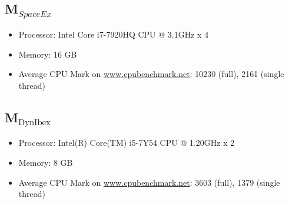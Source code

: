 \documentclass[EPiC]{easychair}
\begin{document}
\subsection{\texorpdfstring{M$_\mathit{SpaceEx}$}{M-SpaceEx}} \label{sec:machine:spaceex}
\begin{itemize}
	\item Processor: Intel Core i7-7920HQ CPU @ 3.1GHz x 4
    \item Memory: 16 GB
    \item Average CPU Mark on \url{www.cpubenchmark.net}: 10230 (full), 2161 (single thread)
\end{itemize}

\subsection{\texorpdfstring{M$_{\text{DynIbex}}$}{M-DynIbex}} \label{sec:machine:DynIbex}
\begin{itemize}
 \item Processor: Intel(R) Core(TM) i5-7Y54 CPU @ 1.20GHz x 2
 \item Memory: 8 GB
 \item Average CPU Mark on \url{www.cpubenchmark.net}: 3603 (full), 1379 (single thread)
\end{itemize}



%
%
%

\end{document}
